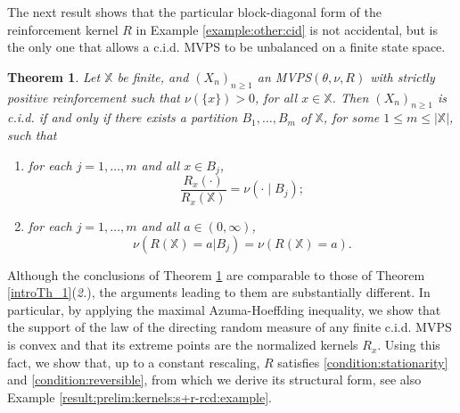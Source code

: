 \documentclass[a4paper]{article}
\theoremstyle{plain}
\newtheorem{theorem}{Theorem}
\theoremstyle{remark}
\theoremstyle{definition}
\begin{document}
The next result shows that the particular block-diagonal form of the reinforcement kernel $R$ in Example \ref{example:other:cid} is not accidental, but is the only one that allows a c.i.d. MVPS to be unbalanced on a finite state space.

\begin{theorem}\label{results:other:cid-balanced}
Let $\mathbb{X}$ be finite, and $(X_n)_{n\geq1}$ an MVPS$(\theta,\nu,R)$ with strictly positive reinforcement such that $\nu(\{x\})>0$, for all $x\in\mathbb{X}$. Then $(X_n)_{n\geq1}$ is c.i.d. if and only if there exists a partition $B_1,\ldots,B_m$ of $\mathbb{X}$, for some $1\leq m\leq|\mathbb{X}|$, such that
\begin{enumerate}
\item for each $j=1,\ldots,m$ and all $x\in B_j$,
\[\frac{R_x(\cdot)}{R_x(\mathbb{X})}=\nu(\cdot\mid B_j);\]
\item for each $j=1,\ldots,m$ and all $a\in(0,\infty)$,
\[\nu(R(\mathbb{X})=a|B_j)=\nu(R(\mathbb{X})=a).\]
\end{enumerate}
\end{theorem}

Although the conclusions of Theorem \ref{results:other:cid-balanced} are comparable to those of Theorem \ref{introTh_1}(\textit{2.}), the arguments leading to them are substantially different. In particular, by applying the maximal Azuma-Hoeffding inequality, we show that the support of the law of the directing random measure of any finite c.i.d. MVPS is convex and that its extreme points are the normalized kernels $R_x$. Using this fact, we show that, up to a constant rescaling, $R$ satisfies \eqref{condition:stationarity} and \eqref{condition:reversible}, from which we derive its structural form, see also Example \ref{result:prelim:kernels:s+r-rcd:example}.
\end{document}
